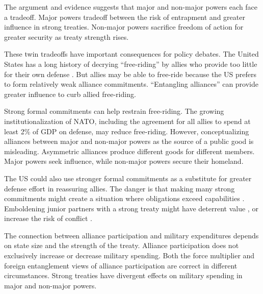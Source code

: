\documentclass[12pt]{article}
\begin{document}
The argument and evidence suggests that major and non-major powers each face a tradeoff. 
Major powers tradeoff between the risk of entrapment and greater influence in strong treaties. 
Non-major powers sacrifice freedom of action for greater security as treaty strength rises. 


These twin tradeoffs have important consequences for policy debates.
The United States has a long history of decrying ``free-riding'' by allies who provide too little for their own defense \citep{Lanoszka2015}. 
But allies may be able to free-ride because the US prefers to form relatively weak alliance commitments. 
``Entangling alliances'' can provide greater influence to curb allied free-riding. 


Strong formal commitments can help restrain free-riding. 
The growing institutionalization of NATO, including the agreement for all allies to spend at least 2\% of GDP on defense, may reduce free-riding. 
However, conceptualizing alliances between major and non-major powers as the source of a public good is misleading. 
Asymmetric alliances produce different goods for different members. 
Major powers seek influence, while non-major powers secure their homeland. 


The US could also use stronger formal commitments as a substitute for greater defense effort in reassuring allies.
The danger is that making many strong commitments might create a situation where obligations exceed capabilities \citep{Kennedy1987}. 
Emboldening junior partners with a strong treaty might have deterrent value \citep{Bensonetal2014}, or increase the risk of conflict \citep{Benson2012}. 

 
The connection between alliance participation and military expenditures depends on state size and the strength of the treaty.  
Alliance participation does not exclusively increase or decrease military spending.  
Both the force multiplier and foreign entanglement views of alliance participation are correct in different circumstances. 
Strong treaties have divergent effects on military spending in major and non-major powers. 



 
 
\end{document}
